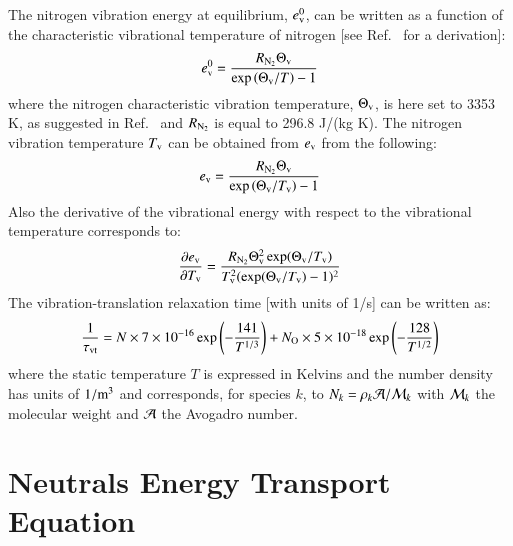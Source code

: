 \documentclass{warpdoc}
\newcommand{\mfd}{\displaystyle}
\newcommand{\ev}{{e_{\rm v}}}
\let\citen\cite
\begin{document}
The nitrogen vibration energy at equilibrium, $e_{\rm v}^0$, can be written as a function of the characteristic vibrational temperature of nitrogen [see Ref.\ \citen{book:1989:anderson} for a derivation]:
%
\begin{equation}
  e_{\rm v}^0=\frac{R_{\rm N_2} \Theta_{\rm v}}{\exp\left(\Theta_{\rm v}/T\right)-1}
\end{equation}
%
where the nitrogen characteristic vibration temperature, $\Theta_{\rm v}$, is here set to 3353 K, as suggested in Ref.\ \citen{book:1962:barrow} and $R_{\rm N_2}$ is equal
to 296.8 J/(kg K). 
The nitrogen vibration temperature $T_{\rm v}$ can be obtained from $e_{\rm v}$ from the following:
%
\begin{equation}
  e_{\rm v}=\frac{R_{\rm N_2} \Theta_{\rm v}}{\exp\left(\Theta_{\rm v}/T_{\rm v}\right)-1}
\end{equation}
%
Also the derivative of the vibrational energy with respect to the vibrational temperature corresponds to:
%
\begin{equation}
  \frac{\partial \ev}{\partial T_{\rm v}} =
  \frac{R_{\rm N_2} \Theta_{\rm v}^2 \exp(\Theta_{\rm v}/T_{\rm v})}
       {T_{\rm v}^2 (\exp(\Theta_{\rm v}/T_{\rm v})-1)^2}
\end{equation}
%
The vibration-translation relaxation time [with units of 1/s] can be written as:\cite{aiaa:2001:macheret,aiaaconf:1999:macheret}
%
\begin{equation}
 \begin{array}{l}
  \mfd\frac{1}{\tau_{\rm vt}}= N \times 7 \times 10^{-16} \exp \left( -\frac{141} {T^{1/3}}  \right)   + N_{\rm O} \times 5 \times 10^{-18} \exp \left( -\frac{128}{ T^{1/2}}\right)
 \end{array}
\end{equation}
%
where the static temperature $T$ is expressed in Kelvins and the number density has units of $1/{\rm m}^3$ and corresponds, for species $k$, to $N_k=\rho_k {\cal A}/{\cal M}_k$ with ${\cal M}_k$ the molecular weight and ${\cal A}$ the Avogadro number.




















\section{Neutrals Energy Transport Equation}
\end{document}
